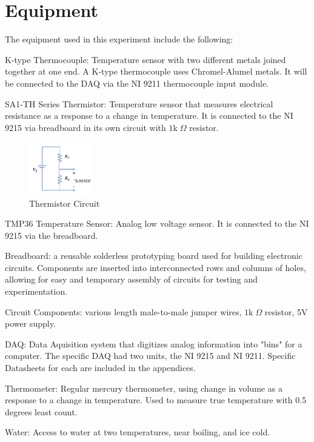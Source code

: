 \documentclass{article}
\begin{document}
\section{Equipment}
The equipment used in this experiment include the following:  

K-type Thermocouple:  Temperature sensor with two different metals joined together at one end.  A K-type thermocouple uses Chromel-Alumel metals.  It will be connected to the DAQ via the NI 9211 thermocouple input module.  

SA1-TH Series Thermistor:  Temperature sensor that measures electrical resistance as a response to a change in temperature.  It is connected to the NI 9215 via breadboard in its own circuit with $1\text{k}\;\Omega$ resistor.
\begin{figure}[H]
    \centering
    \includegraphics[width=0.25\textwidth]{Lab 2/lab2images/thermistor_circuit.jpg}
    \caption{Thermistor Circuit}
\end{figure}

TMP36 Temperature Sensor: Analog low voltage sensor.  It is connected to the NI 9215 via the breadboard.  

Breadboard: a reusable solderless prototyping board used for building electronic circuits. Components are inserted into interconnected rows and columns of holes, allowing for easy and temporary assembly of circuits for testing and experimentation.

Circuit Components:  various length male-to-male jumper wires, $1\text{k}\;\Omega$ resistor, 5V power supply.

DAQ:  Data Aquisition system that digitizes analog information into "bins" for a computer.  The specific DAQ had two units, the NI 9215 and NI 9211.  Specific Datasheets for each are included in the appendices.  

Thermometer:  Regular mercury thermometer, using change in volume as a response to a change in temperature.  Used to measure true temperature with 0.5 degrees least count.  

Water:  Access to water at two temperatures, near boiling, and ice cold. 
\end{document}
